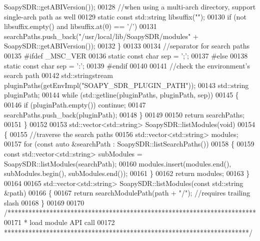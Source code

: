 \begin{DoxyCode}
{      SoapySDR::getABIVersion());
00128         \textcolor{comment}{//when using a multi-arch directory, support single-arch path as well}
00129         \textcolor{keyword}{static} \textcolor{keyword}{const} std::string libsuffix(\textcolor{stringliteral}{""});
00130         \textcolor{keywordflow}{if} (not libsuffix.empty() and libsuffix.at(0) == \textcolor{charliteral}{'/'})
00131             searchPaths.push\_back(\textcolor{stringliteral}{"/usr/local/lib/SoapySDR/modules"} + 
      SoapySDR::getABIVersion());
00132     \}
00133 
00134     \textcolor{comment}{//separator for search paths}
00135 \textcolor{preprocessor}{    #ifdef \_MSC\_VER}
00136     \textcolor{keyword}{static} \textcolor{keyword}{const} \textcolor{keywordtype}{char} sep = \textcolor{charliteral}{';'};
00137 \textcolor{preprocessor}{    #else}
00138     \textcolor{keyword}{static} \textcolor{keyword}{const} \textcolor{keywordtype}{char} sep = \textcolor{charliteral}{':'};
00139 \textcolor{preprocessor}{    #endif}
00140 
00141     \textcolor{comment}{//check the environment's search path}
00142     std::stringstream pluginPaths(getEnvImpl(\textcolor{stringliteral}{"SOAPY\_SDR\_PLUGIN\_PATH"}));
00143     std::string pluginPath;
00144     \textcolor{keywordflow}{while} (std::getline(pluginPaths, pluginPath, sep))
00145     \{
00146         \textcolor{keywordflow}{if} (pluginPath.empty()) \textcolor{keywordflow}{continue};
00147         searchPaths.push\_back(pluginPath);
00148     \}
00149 
00150     \textcolor{keywordflow}{return} searchPaths;
00151 \}
00152 
00153 std::vector<std::string> SoapySDR::listModules(\textcolor{keywordtype}{void})
00154 \{
00155     \textcolor{comment}{//traverse the search paths}
00156     std::vector<std::string> modules;
00157     \textcolor{keywordflow}{for} (\textcolor{keyword}{const} \textcolor{keyword}{auto} &searchPath : SoapySDR::listSearchPaths())
00158     \{
00159         \textcolor{keyword}{const} std::vector<std::string> subModules = SoapySDR::listModules(searchPath);
00160         modules.insert(modules.end(), subModules.begin(), subModules.end());
00161     \}
00162     \textcolor{keywordflow}{return} modules;
00163 \}
00164 
00165 std::vector<std::string> SoapySDR::listModules(\textcolor{keyword}{const} std::string &path)
00166 \{
00167     \textcolor{keywordflow}{return} searchModulePath(path + \textcolor{stringliteral}{"/"}); \textcolor{comment}{//requires trailing slash}
00168 \}
00169 
00170 \textcolor{comment}{/***********************************************************************}
00171 \textcolor{comment}{ * load module API call}
00172 \textcolor{comment}{ **********************************************************************/}
}
\end{DoxyCode}
